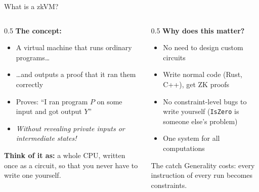 \ifdefined\PRESENTATION\else\PassOptionsToClass{handout}{beamer}\fi\documentclass[aspectratio=169, lualatex]{beamer}
\begin{document}
\begin{frame}{What is a zkVM?}
	\begin{columns}[c]
		\begin{column}{0.5\textwidth}
			\textbf{The concept:}
			\begin{itemize}
				\item A virtual machine that runs ordinary programs\ldots
				\item \ldots and outputs a proof that it ran them correctly
				\item Proves: ``I ran program $P$ on some input and got output $Y$''
				\item \textit{Without revealing private inputs or intermediate states!}
			\end{itemize}
			\textbf{Think of it as:} a whole CPU, written once as a circuit, so that you never have to write one yourself.
		\end{column}
		\begin{column}{0.5\textwidth}
			\textbf{Why does this matter?}
			\begin{itemize}
				\item No need to design custom circuits
				\item Write normal code (Rust, C++), get ZK proofs
				\item No constraint-level bugs to write yourself (\texttt{IsZero} is someone else's problem)
				\item One system for all computations
			\end{itemize}
			\begin{alertblock}{The catch}
				Generality costs: every instruction of every run becomes constraints.
			\end{alertblock}
		\end{column}
	\end{columns}
\end{frame}
\end{document}
